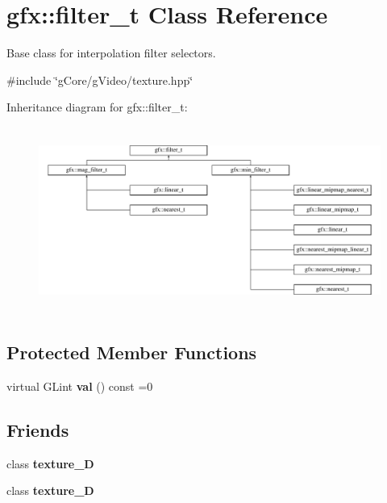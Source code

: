 \hypertarget{classgfx_1_1filter__t}{\section{gfx\-:\-:filter\-\_\-t Class Reference}
\label{classgfx_1_1filter__t}
}


Base class for interpolation filter selectors.  




{\ttfamily \#include \char`\"{}g\-Core/g\-Video/texture.\-hpp\char`\"{}}

Inheritance diagram for gfx\-:\-:filter\-\_\-t\-:\begin{figure}[H]
\begin{center}
\leavevmode
\includegraphics[height=6.120219cm]{classgfx_1_1filter__t}
\end{center}
\end{figure}
\subsection*{Protected Member Functions}
\begin{DoxyCompactItemize}
\item 
\hypertarget{classgfx_1_1filter__t_a131f10d9038f1ca5ac047e690ba7494e}{virtual G\-Lint {\bfseries val} () const =0}\label{classgfx_1_1filter__t_a131f10d9038f1ca5ac047e690ba7494e}

\end{DoxyCompactItemize}
\subsection*{Friends}
\begin{DoxyCompactItemize}
\item 
\hypertarget{classgfx_1_1filter__t_a2039d67f6166ccf823c78e3476aad9aa}{class {\bfseries texture\-\_\-D}}\label{classgfx_1_1filter__t_a2039d67f6166ccf823c78e3476aad9aa}

\item 
\hypertarget{classgfx_1_1filter__t_a22ad86ef46c3b17357a0cd59e50bc7dd}{class {\bfseries texture\-\_\-D}}\label{classgfx_1_1filter__t_a22ad86ef46c3b17357a0cd59e50bc7dd}

\end{DoxyCompactItemize}


